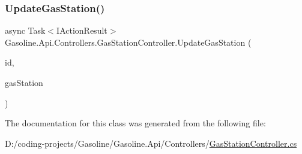 \mbox{\label{class_gasoline_1_1_api_1_1_controllers_1_1_gas_station_controller_a0cd180bdc7cab32b263a2da6688acc4c}} 
\subsubsection{\texorpdfstring{UpdateGasStation()}{UpdateGasStation()}}
{\footnotesize\ttfamily async Task$<$I\+Action\+Result$>$ Gasoline.\+Api.\+Controllers.\+Gas\+Station\+Controller.\+Update\+Gas\+Station (\begin{DoxyParamCaption}\item[{Guid}]{id,  }\item[{\mbox{[}\+From\+Body\mbox{]} \mbox{\hyperlink{class_gasoline_1_1_data_1_1_models_1_1_gas_station}{Gas\+Station}}}]{gas\+Station }\end{DoxyParamCaption})}



The documentation for this class was generated from the following file\+:\begin{DoxyCompactItemize}
\item 
D\+:/coding-\/projects/\+Gasoline/\+Gasoline.\+Api/\+Controllers/\mbox{\hyperlink{_gas_station_controller_8cs}{Gas\+Station\+Controller.\+cs}}\end{DoxyCompactItemize}
